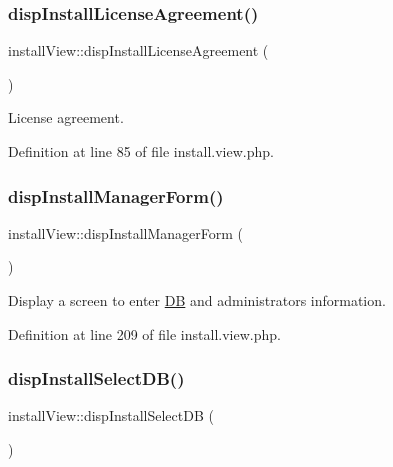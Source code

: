 \subsubsection{\texorpdfstring{disp\+Install\+License\+Agreement()}{dispInstallLicenseAgreement()}}
{\footnotesize\ttfamily install\+View\+::disp\+Install\+License\+Agreement (\begin{DoxyParamCaption}{ }\end{DoxyParamCaption})}



License agreement. 



Definition at line 85 of file install.\+view.\+php.

\hypertarget{classinstallView_a00758f2134453587a409e8e8f3e4fada}{}\label{classinstallView_a00758f2134453587a409e8e8f3e4fada} 
\subsubsection{\texorpdfstring{disp\+Install\+Manager\+Form()}{dispInstallManagerForm()}}
{\footnotesize\ttfamily install\+View\+::disp\+Install\+Manager\+Form (\begin{DoxyParamCaption}{ }\end{DoxyParamCaption})}



Display a screen to enter \hyperlink{classDB}{DB} and administrator\textquotesingle{}s information. 



Definition at line 209 of file install.\+view.\+php.

\hypertarget{classinstallView_aa3ee9747353f128111f628a5c9359c5f}{}\label{classinstallView_aa3ee9747353f128111f628a5c9359c5f} 
\subsubsection{\texorpdfstring{disp\+Install\+Select\+D\+B()}{dispInstallSelectDB()}}
{\footnotesize\ttfamily install\+View\+::disp\+Install\+Select\+DB (\begin{DoxyParamCaption}{ }\end{DoxyParamCaption})}



